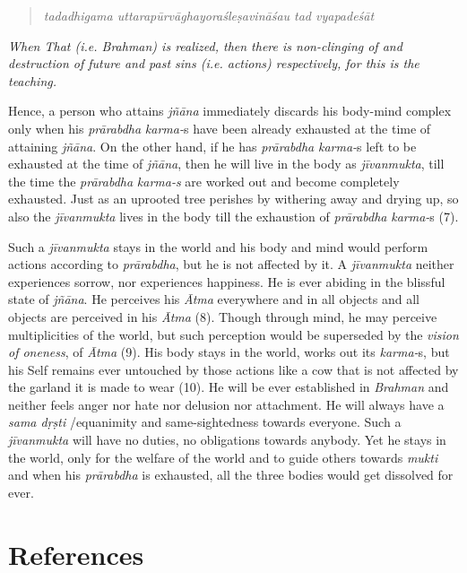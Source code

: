\begin{verse}
\emph{tadadhigama uttarapūrvāghayoraśleṣavināśau tad vyapadeśāt~}
\end{verse}

\emph{When That (i.e. Brahman) is realized, then there is non-clinging of and destruction of future and past sins (i.e. actions) respectively, for this is the teaching.}

Hence, a person who attains \emph{jñāna} immediately discards his body-mind complex only when his \emph{prārabdha} \emph{karma-}s have been already exhausted at the time of attaining \emph{jñāna}. On the other hand, if he has \emph{prārabdha} \emph{karma-}s left to be exhausted at the time of \emph{jñāna}, then he will live in the body as \emph{jīvanmukta}, till the time the \emph{prārabdha} \emph{karma-s} are worked out and become completely exhausted. Just as an uprooted tree perishes by withering away and drying up, so also the \emph{jīvanmukta} lives in the body till the exhaustion of \emph{prārabdha} \emph{karma-}s (7).

Such a \emph{jīvanmukta} stays in the world and his body and mind would perform actions according to \emph{prārabdha}, but he is not affected by it. A \emph{jīvanmukta} neither experiences sorrow, nor experiences happiness. He is ever abiding in the blissful state of \emph{jñāna}. He perceives his \emph{Ātma} everywhere and in all objects and all objects are perceived in his \emph{Ātma} (8). Though through mind, he may perceive multiplicities of the world, but such perception would be superseded by the \emph{vision of oneness}, of \emph{Ātma} (9). His body stays in the world, works out its \emph{karma-}s, but his Self remains ever untouched by those actions like a cow that is not affected by the garland it is made to wear (10). He will be ever established in \emph{Brahman} and neither feels anger nor hate nor delusion nor attachment. He will always have a \emph{sama dṛṣti} /equanimity and same-sightedness towards everyone. Such a \emph{jīvanmukta} will have no duties, no obligations towards anybody. Yet he stays in the world, only for the welfare of the world and to guide others towards \emph{mukti} and when his \emph{prārabdha} is exhausted, all the three bodies would get dissolved for ever.

\section*{References}

